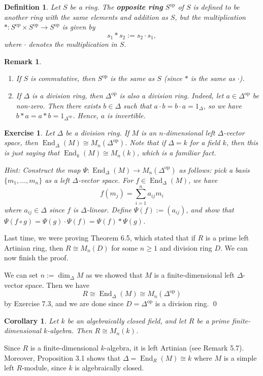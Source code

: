 \documentclass[10pt]{article}
\makeatletter
\numberwithin{equation}{section}
\DeclareMathOperator{\End}{End}
\DeclareMathOperator{\op}{op}
\theoremstyle{newstyle}
\newtheorem{cor}[thm]{Corollary}
\newtheorem{remark}[thm]{Remark}
\newtheorem{defn}[thm]{Definition}
\newtheorem{exercise}[thm]{Exercise}
\newenvironment{pf}[1][\proofname]{\par
  \pushQED{\qed}%
  \normalfont \topsep0\p@\relax
  \trivlist
  \item[\hskip\labelsep\scshape
  #1\@addpunct{.}]\ignorespaces
}{%
  \popQED\endtrivlist\@endpefalse
}
\makeatother
\begin{document}
\begin{defn}
Let $S$ be a ring. The {\bf opposite ring} $S^{\op}$ of $S$ is defined to be another ring with 
the same elements and addition as $S$, but the multiplication $* : S^{\op} \times S^{\op} \to S^{\op}$ is given by 
\[ s_1 * s_2 := s_2 \cdot s_1, \]
where $\cdot$ denotes the multiplication in $S$. 
\end{defn}

\begin{remark}~
\begin{enumerate}[(1)]
    \item If $S$ is commutative, then $S^{\op}$ is the same as $S$ (since $*$ is the same as $\cdot$).
    \item If $\Delta$ is a division ring, then $\Delta^{\op}$ is also a division ring. Indeed, 
    let $a \in \Delta^{\op}$ be non-zero. Then there exists $b \in \Delta$ such that 
    $a \cdot b = b \cdot a = 1_\Delta$, so we have $b * a = a * b = 1_{\Delta^{\op}}$. Hence, 
    $a$ is invertible. 
\end{enumerate}
\end{remark}

\begin{exercise}
Let $\Delta$ be a division ring. If $M$ is an $n$-dimensional left $\Delta$-vector space, then 
$\End_\Delta(M) \cong M_n(\Delta^{\op})$. Note that if $\Delta = k$ for a field $k$, then this is just saying that $\End_k(M) \cong M_n(k)$, which is a familiar fact.

Hint: Construct the map $\Psi : \End_\Delta(M) \to M_n(\Delta^{\op})$ as follows: pick a basis 
$\{m_1, \dots, m_n\}$ as a left $\Delta$-vector space. For $f \in \End_\Delta(M)$, we have 
\[ f(m_j) = \sum_{i=1}^n a_{ij} m_i \]
where $a_{ij} \in \Delta$ since $f$ is $\Delta$-linear. Define $\Psi(f) := (a_{ij})$, and 
show that $\Psi(f \circ g) = \Psi(g) \cdot \Psi(f) = \Psi(f) * \Psi(g)$. 
\end{exercise}

Last time, we were proving Theorem 6.5, which stated that if $R$ is a prime left Artinian ring, 
then $R \cong M_n(D)$ for some $n \geq 1$ and division ring $D$. We can now finish the proof. 

We can set $n := \dim_\Delta M$ as we showed that $M$ is a finite-dimensional left $\Delta$-vector space.
Then we have 
\[ R \cong \End_\Delta(M) \cong M_n(\Delta^{\op}) \]
by Exercise 7.3, and we are done since $D = \Delta^{\op}$ is a division ring. \qed

\begin{cor}
Let $k$ be an algebraically closed field, and let $R$ be a prime finite-dimensional $k$-algebra. Then 
$R \cong M_n(k)$. 
\end{cor}
\begin{pf}
Since $R$ is a finite-dimensional $k$-algebra, it is left Artinian (see Remark 5.7). Moreover,
Proposition 3.1 shows that $\Delta = \End_R(M) \cong k$ where $M$ is a simple left 
$R$-module, since $k$ is algebraically closed. 
\end{pf}
\end{document}
